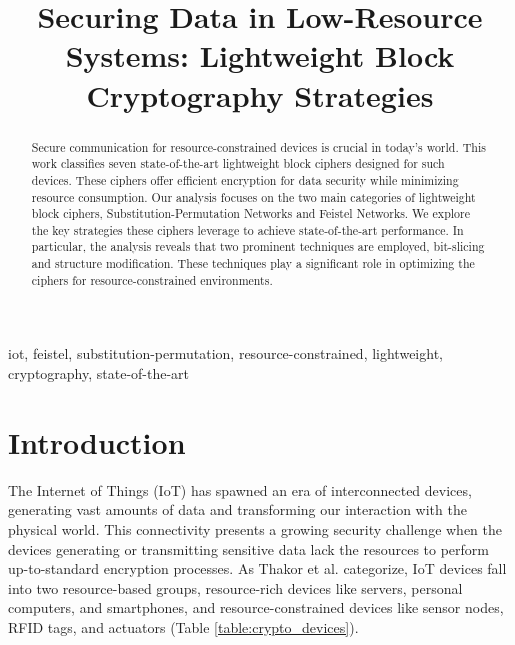 \documentclass[conference]{IEEEtran}
\begin{document}
\title{Securing Data in Low-Resource Systems: Lightweight Block Cryptography Strategies}


\author{
\and
{}
}


\maketitle

\begin{abstract}
    Secure communication for resource-constrained devices is crucial in today's world. This work classifies seven state-of-the-art lightweight block ciphers designed for such devices. These ciphers offer efficient encryption for data security while minimizing resource consumption. Our analysis focuses on the two main categories of lightweight block ciphers, Substitution-Permutation Networks and Feistel Networks. We explore the key strategies these ciphers leverage to achieve state-of-the-art performance. In particular, the analysis reveals that two prominent techniques are employed, bit-slicing and structure modification. These techniques play a significant role in optimizing the ciphers for resource-constrained environments.
\end{abstract}

\begin{IEEEkeywords}
iot, feistel, substitution-permutation, resource-constrained, lightweight, cryptography, state-of-the-art
\end{IEEEkeywords}

\section{Introduction}

The Internet of Things (IoT) has spawned an era of interconnected devices, generating vast amounts of data and transforming our interaction with the physical world. This connectivity presents a growing security challenge when the devices generating or transmitting sensitive data lack the resources to perform up-to-standard encryption processes. As Thakor et al. \cite{IoT_1} categorize, IoT devices fall into two resource-based groups, resource-rich devices like servers, personal computers, and smartphones, and resource-constrained devices like sensor nodes, RFID tags, and actuators (Table \ref{table:crypto_devices}).
\end{document}
